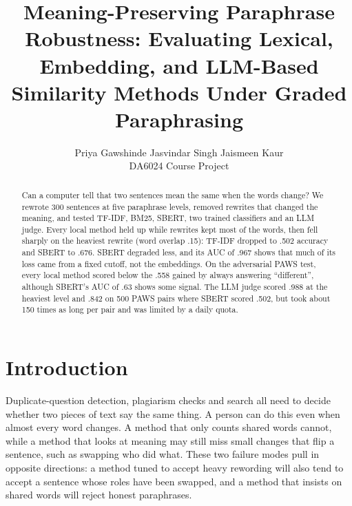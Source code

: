 \documentclass[11pt]{article}
\title{Meaning-Preserving Paraphrase Robustness: Evaluating Lexical, Embedding, and LLM-Based Similarity Methods Under Graded Paraphrasing}
\author{Priya Gawshinde \And Jasvindar Singh \And Jaismeen Kaur \\
  DA6024 Course Project}
\begin{document}
\maketitle

\begin{abstract}
Can a computer tell that two sentences mean the same when the words change? We rewrote 300 sentences at five paraphrase levels, removed rewrites that changed the meaning, and tested TF-IDF, BM25, SBERT, two trained classifiers and an LLM judge. Every local method held up while rewrites kept most of the words, then fell sharply on the heaviest rewrite (word overlap .15): TF-IDF dropped to .502 accuracy and SBERT to .676. SBERT degraded less, and its AUC of .967 shows that much of its loss came from a fixed cutoff, not the embeddings. On the adversarial PAWS test, every local method scored below the .558 gained by always answering “different”, although SBERT's AUC of .63 shows some signal. The LLM judge scored .988 at the heaviest level and .842 on 500 PAWS pairs where SBERT scored .502, but took about 150 times as long per pair and was limited by a daily quota.
\end{abstract}

\section{Introduction}
Duplicate-question detection, plagiarism checks and search all need to decide whether two pieces of text say the same thing. A person can do this even when almost every word changes. A method that only counts shared words cannot, while a method that looks at meaning may still miss small changes that flip a sentence, such as swapping who did what. These two failure modes pull in opposite directions: a method tuned to accept heavy rewording will also tend to accept a sentence whose roles have been swapped, and a method that insists on shared words will reject honest paraphrases.
\end{document}
